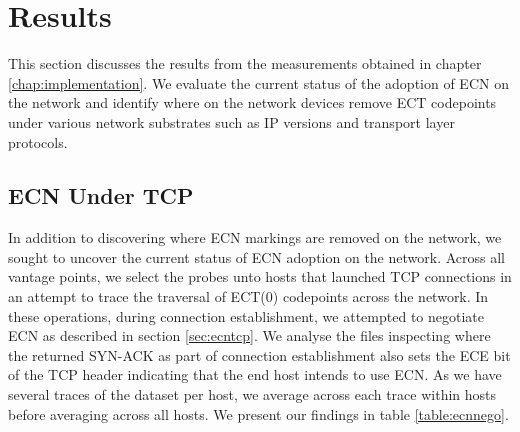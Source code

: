 \documentclass{l4proj}
\begin{document}
\chapter{Results}
\label{chap:evaluation}

This section discusses the results from the measurements obtained in chapter \ref{chap:implementation}. We evaluate the current status of the adoption of ECN on the network and identify where on the network devices remove ECT codepoints under various network substrates such as IP versions and transport layer protocols.

\section{ECN Under TCP}
\label{sec:tcpstrip}

In addition to discovering where ECN markings are removed on the network, we sought to uncover the current status of ECN adoption on the network. Across all vantage points, we select the probes unto hosts that launched TCP connections in an attempt to trace the traversal of ECT(0) codepoints across the network. In these operations, during connection establishment, we attempted to negotiate ECN as described in section \ref{sec:ecntcp}. We analyse the files inspecting where the returned SYN-ACK as part of connection establishment also sets the ECE bit of the TCP header indicating that the end host intends to use ECN. As we have several traces of the dataset per host, we average across each trace within hosts before averaging across all hosts. We present our findings in table \ref{table:ecnnego}.

\begin{table}[H]
\centering

\caption{Percentage of hosts willing to negotiate ECN by Host sample and IP version utilised. We notice no appreciable difference in ECN adoption between host samples, and a slight increase between IPv4 hosts to IPv6 hosts of the same host sample.}
\label{table:ecnnego}
\end{table}
\end{document}

